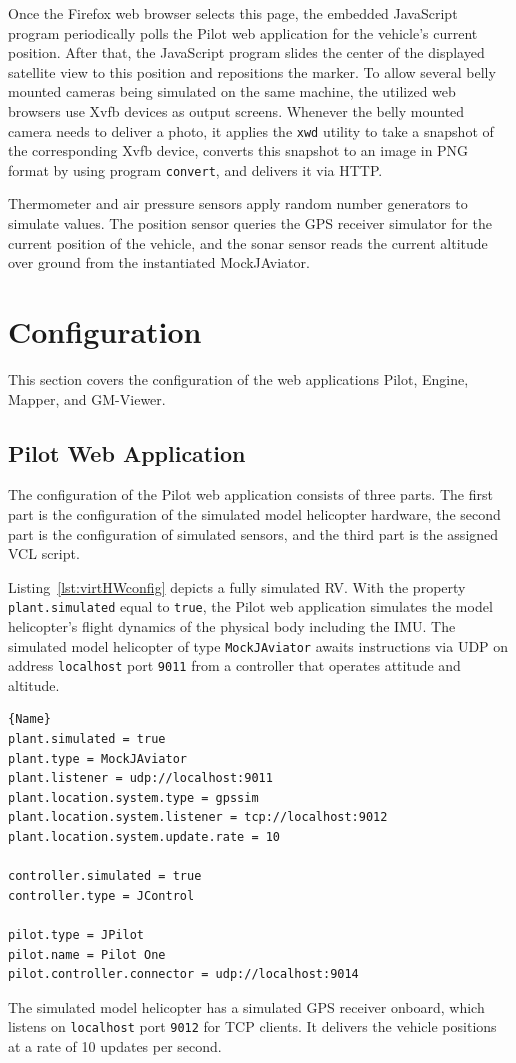 Once the Firefox web browser selects this page, the embedded JavaScript program periodically polls the Pilot web
application for the vehicle's current position. After that, the JavaScript program slides the center of the
displayed satellite view to this position and repositions the marker.
To allow several belly mounted cameras being simulated on the same machine, the utilized web browsers use \ac{Xvfb}
devices as output screens.
%
Whenever the belly mounted camera needs to deliver a photo, it applies the \texttt{xwd} utility to take a snapshot
of the corresponding \ac{Xvfb} device, converts this snapshot to an image in PNG format by using program
\texttt{convert}, and delivers it via \ac{HTTP}.

Thermometer and air pressure sensors apply random number generators to simulate values.
The position sensor queries the GPS receiver simulator for the current position of the vehicle, and the sonar
sensor reads the current altitude over ground from the instantiated MockJAviator.

\section{Configuration}
This section covers the configuration of the web applications Pilot, Engine, Mapper, and GM-Viewer.

\subsection{Pilot Web Application}
The configuration of the Pilot web application consists of three parts. The first part is the configuration of the
simulated model helicopter hardware, the second part is the configuration of simulated sensors, and the third
part is the assigned \ac{VCL} script.

Listing~\ref{lst:virtHWconfig} depicts a fully simulated \ac{RV}. With the property \texttt{plant.simulated} equal
to \texttt{true}, the Pilot web application simulates the model helicopter's flight dynamics of the physical body
including the \ac{IMU}.
The simulated model helicopter of type \texttt{MockJAviator} 
awaits instructions via \acs{UDP} on address \texttt{localhost} port \texttt{9011} from a controller that
operates attitude and altitude. 
\lstset{tabsize=3,language=Tex}
\begin{lstlisting}[caption={Virtual Hardware Configuration Example},mathescape=true,label=lst:virtHWconfig]{Name}
plant.simulated = true
plant.type = MockJAviator
plant.listener = udp://localhost:9011
plant.location.system.type = gpssim
plant.location.system.listener = tcp://localhost:9012
plant.location.system.update.rate = 10

controller.simulated = true
controller.type = JControl

pilot.type = JPilot
pilot.name = Pilot One
pilot.controller.connector = udp://localhost:9014
\end{lstlisting}
The simulated model helicopter has a simulated GPS receiver onboard, which listens on \texttt{localhost} port
\texttt{9012} for \acs{TCP} clients. It delivers the vehicle positions at a rate of 10 updates per second.  

